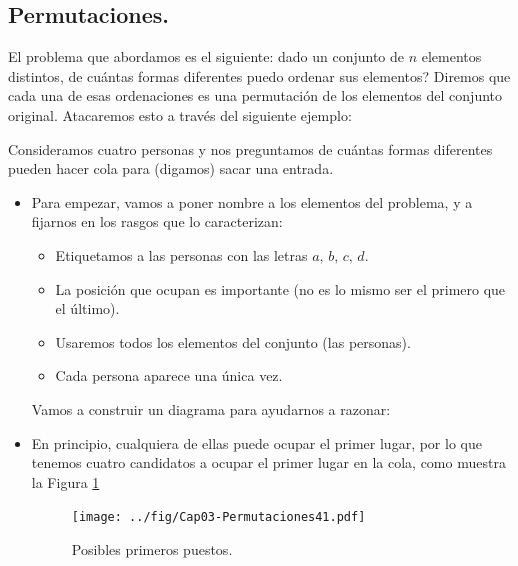 \subsection{Permutaciones.}
\label{cap03:subsec:Permutaciones}

El problema que abordamos es el siguiente: dado un conjunto de $n$ elementos distintos, \textquestiondown de cu\'antas formas diferentes puedo ordenar
sus elementos? Diremos que cada una de esas ordenaciones es una  {\sf permutaci\'on} de los elementos del conjunto original.
Atacaremos esto a trav\'es del siguiente ejemplo:
    \begin{Ejemplo} Consideramos cuatro personas y nos preguntamos
	de cu\'antas formas diferentes pueden hacer cola para (digamos) sacar una entrada.
	\begin{itemize}
		\item Para empezar, vamos a poner nombre a los elementos del problema, y a fijarnos en
        los rasgos que lo caracterizan:
		\begin{itemize}
			\item Etiquetamos a las personas con las letras $a,\,b,\,c,\,d$.
            \item La posición que ocupan es importante (no es lo mismo ser el primero que el \'ultimo).
            \item Usaremos todos los elementos del conjunto (las personas).
            \item Cada persona aparece una \'unica vez.
		\end{itemize}
    	Vamos a construir un diagrama para ayudarnos a razonar:
	
        \item En principio, cualquiera de ellas puede ocupar el primer lugar, por lo que tenemos cuatro candidatos a ocupar el primer lugar en la cola, como muestra la Figura \ref{cap03:fig:arbol1}
        	\begin{center}
            \begin{figure}[h!]	
            \texttt{[image: ../fig/Cap03-Permutaciones41.pdf]}
            \caption{Posibles primeros puestos.}\label{cap03:fig:arbol1}
            \end{figure}
            \end{center}
	

\end{itemize}
\end{Ejemplo}
